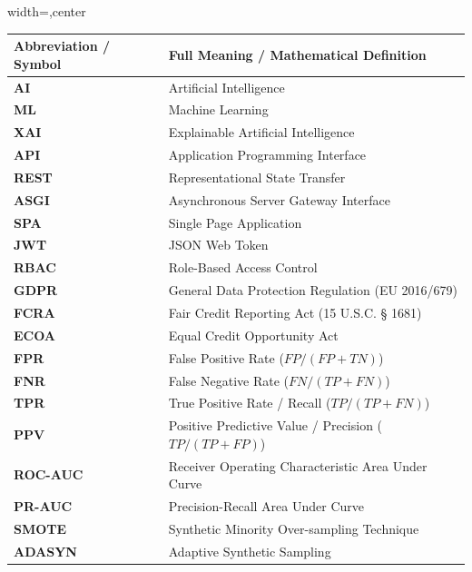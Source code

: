 \documentclass[12pt,a4paper,oneside]{report}
\begin{document}
\begin{table}[H]
\centering
\footnotesize
\begin{adjustbox}{width=\textwidth,center}
\begin{tabular}{| l | l |}
\hline
\rowcolor{tableheader} \textbf{Abbreviation / Symbol} & \textbf{Full Meaning / Mathematical Definition} \\ \hline
\textbf{AI} & Artificial Intelligence \\ \hline
\rowcolor{tablealt} \textbf{ML} & Machine Learning \\ \hline
\textbf{XAI} & Explainable Artificial Intelligence \\ \hline
\rowcolor{tablealt} \textbf{API} & Application Programming Interface \\ \hline
\textbf{REST} & Representational State Transfer \\ \hline
\rowcolor{tablealt} \textbf{ASGI} & Asynchronous Server Gateway Interface \\ \hline
\textbf{SPA} & Single Page Application \\ \hline
\rowcolor{tablealt} \textbf{JWT} & JSON Web Token \\ \hline
\textbf{RBAC} & Role-Based Access Control \\ \hline
\rowcolor{tablealt} \textbf{GDPR} & General Data Protection Regulation (EU 2016/679) \\ \hline
\textbf{FCRA} & Fair Credit Reporting Act (15 U.S.C. \S{} 1681) \\ \hline
\rowcolor{tablealt} \textbf{ECOA} & Equal Credit Opportunity Act \\ \hline
\textbf{FPR} & False Positive Rate ($FP / (FP + TN)$) \\ \hline
\rowcolor{tablealt} \textbf{FNR} & False Negative Rate ($FN / (TP + FN)$) \\ \hline
\textbf{TPR} & True Positive Rate / Recall ($TP / (TP + FN)$) \\ \hline
\rowcolor{tablealt} \textbf{PPV} & Positive Predictive Value / Precision ($TP / (TP + FP)$) \\ \hline
\textbf{ROC-AUC} & Receiver Operating Characteristic Area Under Curve \\ \hline
\rowcolor{tablealt} \textbf{PR-AUC} & Precision-Recall Area Under Curve \\ \hline
\textbf{SMOTE} & Synthetic Minority Over-sampling Technique \\ \hline
\rowcolor{tablealt} \textbf{ADASYN} & Adaptive Synthetic Sampling \\ \hline

\end{tabular}
\end{adjustbox}
\end{table}
\end{document}
